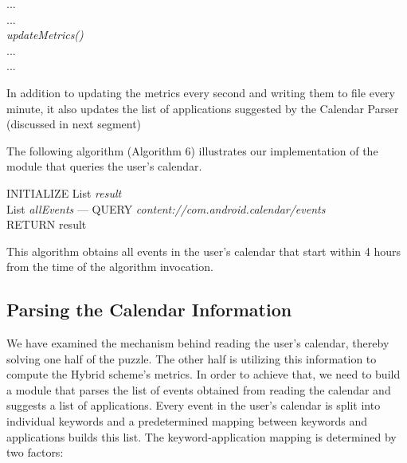 \documentclass[12pt]{uthesis-v12}  %
\begin{document}
			\begin{algorithm}[H]
				\SetAlgoLined
				
				{	
					...\\
					...\\
					{\em updateMetrics()}\\
					...\\
					...\\	
				}
				
				\caption[Update Suggested Applications List]{In addition to updating the metrics every second and writing them to file every minute, it also updates the list of applications suggested by the Calendar Parser (discussed in next segment)}
			\end{algorithm}
			
			The following algorithm (Algorithm 6) illustrates our implementation of the module that queries the user's calendar.
			
			\begin{algorithm}[H]
				\SetAlgoLined
				INITIALIZE List {\em result}\\
				List {\em allEvents} ---  QUERY {\em content://com.android.calendar/events}\\
				{	
				}
				RETURN result
				\caption[Algorithm to read user's calendar]{This algorithm obtains all events in the user's calendar that start within 4 hours from the time of the algorithm invocation.}
			\end{algorithm}
						
		\subsection{Parsing the Calendar Information}
			We have examined the mechanism behind reading the user's calendar, thereby solving one half of the puzzle. The other half is utilizing this information to compute the Hybrid scheme's metrics. In order to achieve that, we need to build a module that parses the list of events obtained from reading the calendar and suggests a list of applications. Every event in the user's calendar is split into individual keywords and a predetermined mapping between keywords and applications builds this list. The keyword-application mapping is determined by two factors:
			
\end{document}
